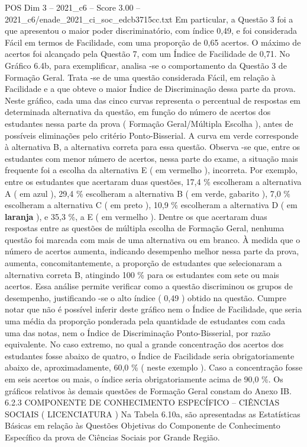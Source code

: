 \begin{textsample}{POS Dim 3 – 2021\_c6 – Score 3.00 – 2021\_c6/enade\_2021\_ci\_soc\_edcb3715cc.txt}
Em particular, a Questão 3 foi a que apresentou o maior poder discriminatório, com índice 0,49, e foi considerada Fácil em termos de Facilidade, com uma proporção de 0,65 acertos.
O máximo de acertos foi alcançado pela Questão 7, com um Índice de Facilidade de 0,71.
No Gráfico 6.4b, para exemplificar, analisa -se o comportamento da Questão 3 de Formação Geral.
Trata -se de uma questão considerada Fácil, em relação à Facilidade e a que obteve o maior Índice de Discriminação dessa parte da prova.
Neste gráfico, cada uma das cinco curvas representa o percentual de respostas em determinada alternativa da questão, em função do número de acertos dos estudantes nessa parte da prova ( Formação Geral/Múltipla Escolha ), antes de possíveis eliminações pelo critério Ponto-Bisserial.
A curva em verde corresponde à alternativa B, a alternativa correta para essa questão.
Observa -se que, entre os estudantes com menor número de acertos, nessa parte do exame, a situação mais frequente foi a escolha da alternativa E ( em vermelho ), incorreta.
Por exemplo, entre os estudantes que acertaram duas questões, 17,4 \% escolheram a alternativa A ( em azul ), 29,4 \% escolheram a alternativa B ( em verde, gabarito ), 7,0 \% escolheram a alternativa C ( em preto ), 10,9 \% escolheram a alternativa D ( em \textbf{laranja} ), e 35,3 \%, a E ( em vermelho ).
Dentre os que acertaram duas respostas entre as questões de múltipla escolha de Formação Geral, nenhuma questão foi marcada com mais de uma alternativa ou em branco.
À medida que o número de acertos aumenta, indicando desempenho melhor nessa parte da prova, aumenta, concomitantemente, a proporção de estudantes que selecionaram a alternativa correta B, atingindo 100 \% para os estudantes com sete ou mais acertos.
Essa análise permite verificar como a questão discriminou os grupos de desempenho, justificando -se o alto índice ( 0,49 ) obtido na questão.
Cumpre notar que não é possível inferir deste gráfico nem o Índice de Facilidade, que seria uma média da proporção ponderada pela quantidade de estudantes com cada uma das notas, nem o Índice de Discriminação Ponto-Bisserial, por razão equivalente.
No caso extremo, no qual a grande concentração dos acertos dos estudantes fosse abaixo de quatro, o Índice de Facilidade seria obrigatoriamente abaixo de, aproximadamente, 60,0 \% ( neste exemplo ).
Caso a concentração fosse em seis acertos ou mais, o índice seria obrigatoriamente acima de 90,0 \%.
Os gráficos relativos às demais questões de Formação Geral constam do Anexo IB. 6.2.3 COMPONENTE DE CONHECIMENTO ESPECÍFICO – CIÊNCIAS SOCIAIS ( LICENCIATURA ) Na Tabela 6.10a, são apresentadas as Estatísticas Básicas em relação às Questões Objetivas do Componente de Conhecimento Específico da prova de Ciências Sociais por Grande Região.

\end{textsample}
